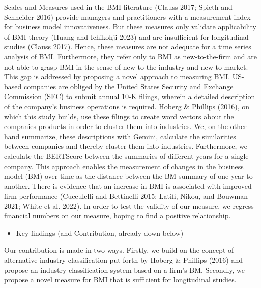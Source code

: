 \documentclass[
]{article}
\providecommand{\tightlist}{%
  \setlength{\itemsep}{0pt}\setlength{\parskip}{0pt}}\usepackage{longtable,booktabs,array}
\begin{document}
Scales and Measures used in the BMI literature (Clauss 2017; Spieth and
Schneider 2016) provide managers and practitioners with a measurement
index for business model innovativeness. But these measures only
validate applicability of BMI theory (Huang and Ichikohji 2023) and are
insufficient for longitudinal studies (Clauss 2017). Hence, these
measures are not adequate for a time series analysis of BMI.
Furthermore, they refer only to BMI as new-to-the-firm and are not able
to grasp BMI in the sense of new-to-the-industry and new-to-market. This
gap is addressed by proposing a novel approach to measuring BMI.
US-based companies are obliged by the United States Security and
Exchange Commission (SEC) to submit annual 10-K filings, wherein a
detailed description of the company's business operations is required.
Hoberg \& Phillips (2016), on which this study builds, use these filings
to create word vectors about the companies products in order to cluster
them into industries. We, on the other hand summarize, these
descriptions with Gemini, calculate the similarities between companies
and thereby cluster them into industries. Furthermore, we calculate the
BERTScore between the summaries of different years for a single company.
This approach enables the measurement of changes in the business model
(BM) over time as the distance between the BM summary of one year to
another. There is evidence that an increase in BMI is associated with
improved firm performance (Cucculelli and Bettinelli 2015; Latifi,
Nikou, and Bouwman 2021; White et al. 2022). In order to test the
validity of our measure, we regress financial numbers on our measure,
hoping to find a positive relationship.

\begin{itemize}
\tightlist
\item
  Key findings (and Contribution, already down below)
\end{itemize}

Our contribution is made in two ways. Firstly, we build on the concept
of alternative industry classification put forth by Hoberg \& Phillips
(2016) and propose an industry classification system based on a firm's
BM. Secondly, we propose a novel measure for BMI that is sufficient for
longitudinal studies.
\end{document}
